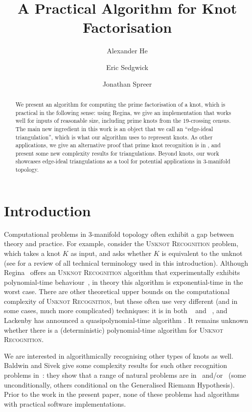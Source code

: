 \documentclass[a4paper,UKenglish,cleveref, autoref, thm-restate]{lipics-v2021}
\title{A Practical Algorithm for Knot Factorisation}
\author{Alexander He}{401 Mathematical Sciences, Oklahoma State University, Stillwater, OK 74078, United States \and \url{https://sites.google.com/view/alex-he} }{alex.he@okstate.edu}{https://orcid.org/0000-0002-2189-4942}{Supported by an Australian Government Research Training Program Scholarship for part of this project}%
\author{Eric Sedgwick}{School of Computing, DePaul University, 243 S Wabash Ave, Chicago, IL 60604, United States}{ESedgwick@cdm.depaul.edu}{https://orcid.org/0000-0003-1995-9097}{}
\author{Jonathan Spreer}{School of Mathematics and Statistics, The University of Sydney, Carslaw Building F07, Camperdown NSW 2006, Australia}{jonathan.spreer@sydney.edu.au}{https://orcid.org/0000-0001-6865-9483}{Supported by the Australian Research Council under the Discovery Project scheme (grant number DP220102588)}
\begin{document}
\maketitle


\begin{abstract}
We present an algorithm for computing the prime factorisation of a knot, which is practical in the following sense:
using Regina, we give an implementation that works well for inputs of reasonable size, including prime knots from the $19$-crossing census.
The main new ingredient in this work is an object that we call an ``edge-ideal triangulation'', which is what our algorithm uses to represent knots.
As other applications, we give an alternative proof that prime knot recognition is in \coNP, and present some new complexity results for triangulations.
Beyond knots, our work showcases edge-ideal triangulations as a tool for potential applications in $3$-manifold topology.
\end{abstract}

\section{Introduction}\label{sec:intro}

Computational problems in $3$-manifold topology often exhibit a gap between theory and practice.
For example, consider the \textsc{Unknot Recognition} problem, which takes a knot $K$ as input, and asks whether $K$ is equivalent to the unknot (see  for a review of all technical terminology used in this introduction).
Although Regina~\cite{Regina} offers an \textsc{Unknot Recognition} algorithm that experimentally exhibits polynomial-time behaviour~\cite{burton2012unknot},
in theory this algorithm is exponential-time in the worst case.
There are other theoretical upper bounds on the computational complexity of \textsc{Unknot Recognition}, but these often use very different (and in some cases, much more complicated) techniques:
it is in both \NP~\cite{hass1999computational} and \coNP~\cite{kuperberg2014knottedness,lackenby2016efficient},
and Lackenby has announced a quasipolynomial-time algorithm \cite{LackenbyTalk}.
It remains unknown whether there is a (deterministic) polynomial-time algorithm for \textsc{Unknot Recognition}.

We are interested in algorithmically recognising other types of knots as well. Baldwin and Sivek give some complexity results for such other recognition problems in~\cite{baldwin2019complexity}:
they show that a range of natural problems are in \NP\ and/or \coNP\ (some unconditionally, others conditional on the Generalised Riemann Hypothesis).
Prior to the work in the present paper, none of these problems had algorithms with practical software implementations.
\end{document}
